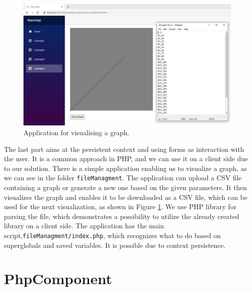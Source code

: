 \begin{figure}[!b]\centering
\includegraphics[scale=0.4]{./img/graph}
\caption{Application for visualising a graph.}
\label{img27:graph}
\end{figure} 
\par
The last part aims at the persistent context and using forms as interaction with the user.
It is a common approach in PHP, and we can use it on a client side due to our solution.
There is a simple application enabling us to visualize a graph, as we can see in the folder \texttt{fileManagment}.
The application can upload a CSV file containing a graph or generate a new one based on the given parameters.
It then visualizes the graph and enables it to be downloaded as a CSV file, which can be used for the next visualization, as shown in Figure \ref{img27:graph}.
We use PHP library for parsing the file, which demonstrates a possibility to utilize the already created library on a client side.
The application has the main script,\texttt{fileManagment/index.php}, which recognizes what to do based on superglobals and saved variables.
It is possible due to context persistence.

\section{PhpComponent}

